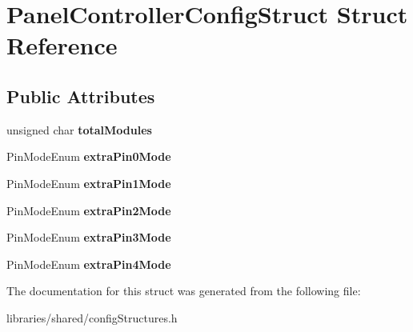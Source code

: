 \hypertarget{struct_panel_controller_config_struct}{}\section{Panel\+Controller\+Config\+Struct Struct Reference}
\label{struct_panel_controller_config_struct}
\subsection*{Public Attributes}
\begin{DoxyCompactItemize}
\item 
\mbox{\label{struct_panel_controller_config_struct_a1fe6cbb4a32d5ef7db8dfeb79b08cdb9}} 
unsigned char {\bfseries total\+Modules}
\item 
\mbox{\label{struct_panel_controller_config_struct_a04cdc83d3a5ddd7dd7a5209e9cb41f76}} 
Pin\+Mode\+Enum {\bfseries extra\+Pin0\+Mode}
\item 
\mbox{\label{struct_panel_controller_config_struct_ac46e2195e6bb9d705d8bf4a1f711ff62}} 
Pin\+Mode\+Enum {\bfseries extra\+Pin1\+Mode}
\item 
\mbox{\label{struct_panel_controller_config_struct_ab8879130fd751360048ad2f54ac9bf88}} 
Pin\+Mode\+Enum {\bfseries extra\+Pin2\+Mode}
\item 
\mbox{\label{struct_panel_controller_config_struct_a7dcb25d57281e96fba0a1ed4bd38117b}} 
Pin\+Mode\+Enum {\bfseries extra\+Pin3\+Mode}
\item 
\mbox{\label{struct_panel_controller_config_struct_adc5947e3a2e1dee09fb422427713b8c0}} 
Pin\+Mode\+Enum {\bfseries extra\+Pin4\+Mode}
\end{DoxyCompactItemize}


The documentation for this struct was generated from the following file\+:\begin{DoxyCompactItemize}
\item 
libraries/shared/config\+Structures.\+h\end{DoxyCompactItemize}
